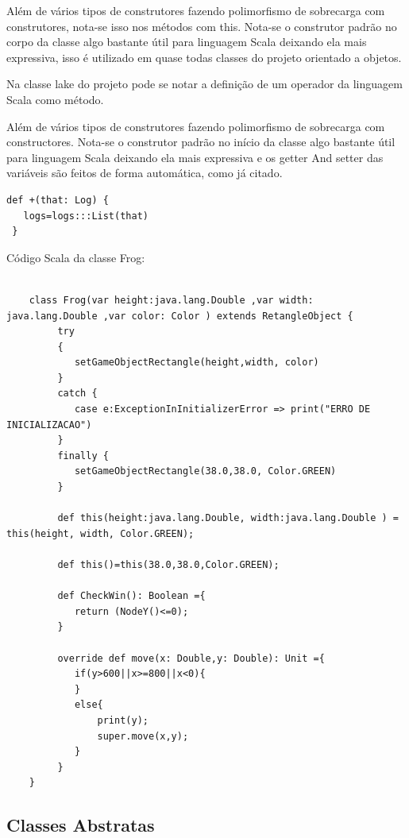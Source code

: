 \documentclass[rel-mlp]{iiufrgs}
\begin{document}
 Além de vários tipos de construtores fazendo polimorfismo de sobrecarga com construtores, nota-se isso nos métodos com this. Nota-se o construtor padrão no corpo da classe algo bastante útil para linguagem Scala deixando ela mais expressiva, isso é utilizado em quase todas classes do projeto orientado a objetos.
 
 Na classe lake do projeto pode se notar a definição de um operador da linguagem Scala como método.

 Além de vários tipos de construtores fazendo polimorfismo de sobrecarga com constructores. Nota-se o construtor padrão no início da classe algo bastante útil para linguagem Scala deixando ela mais expressiva e os getter And setter das variáveis são feitos de forma automática, como já citado.

\begin{lstlisting}
def +(that: Log) {
   logs=logs:::List(that)
 }
\end{lstlisting}

\newpage
Código Scala da classe Frog:

\begin{lstlisting}
    
    class Frog(var height:java.lang.Double ,var width: java.lang.Double ,var color: Color ) extends RetangleObject {
         try
         {
            setGameObjectRectangle(height,width, color)
         }
         catch {
            case e:ExceptionInInitializerError => print("ERRO DE INICIALIZACAO")
         }
         finally {
            setGameObjectRectangle(38.0,38.0, Color.GREEN)
         }
         
         def this(height:java.lang.Double, width:java.lang.Double ) = this(height, width, Color.GREEN);
         
         def this()=this(38.0,38.0,Color.GREEN);
         
         def CheckWin(): Boolean ={
            return (NodeY()<=0);
         }
            
         override def move(x: Double,y: Double): Unit ={
            if(y>600||x>=800||x<0){
            }   
            else{
                print(y);
                super.move(x,y);
            }
         }
    }
\end{lstlisting}


\newpage
\subsection{Classes Abstratas}
\end{document}
